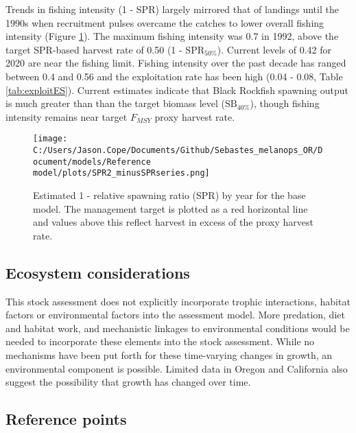 \documentclass[11pt,
  english,
  letterpaper,
]{article}
\begin{document}
Trends in fishing intensity (1 - SPR) largely mirrored that of landings until the 1990s when recruitment pulses overcame the catches to lower overall fishing intensity (Figure \ref{fig:es-1-spr}). The maximum fishing intensity was 0.7 in 1992, above the target SPR-based harvest rate of 0.50 (1 - \(\text{SPR}_{50\%}\)). Current levels of 0.42 for 2020 are near the fishing limit. Fishing intensity over the past decade has ranged between 0.4 and 0.56 and the exploitation rate has been high (0.04 - 0.08, Table \ref{tab:exploitES}). Current estimates indicate that Black Rockfish spawning output is much greater than than the target biomass level (\(\text{SB}_{40\%}\)), though fishing intensity remains near target \(F_{MSY}\) proxy harvest rate.



\begin{figure}
\centering
\texttt{[image: C:/Users/Jason.Cope/Documents/Github/Sebastes\_melanops\_OR/Document/models/Reference model/plots/SPR2\_minusSPRseries.png]}
\caption{Estimated 1 - relative spawning ratio (SPR) by year for the base model. The management target is plotted as a red horizontal line and values above this reflect harvest in excess of the proxy harvest rate.\label{fig:es-1-spr}}
\end{figure}

\clearpage

\hypertarget{ecosystem-considerations}{%
\subsection*{Ecosystem considerations}\label{ecosystem-considerations}}

This stock assessment does not explicitly incorporate trophic interactions, habitat factors or environmental factors into the assessment model. More predation, diet and habitat work, and mechanistic linkages to environmental conditions would be needed to incorporate these elements into the stock assessment. While no mechanisms have been put forth for these time-varying changes in growth, an environmental component is possible. Limited data in Oregon and California also suggest the possibility that growth has changed over time.

\hypertarget{reference-points}{%
\subsection*{Reference points}\label{reference-points}}
\end{document}
